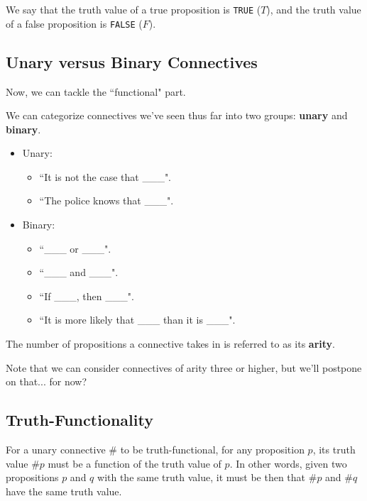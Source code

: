 \documentclass[openany]{book}
\begin{document}
We say that the truth value of a true proposition is \texttt{TRUE} ($T$), and the truth value of a false proposition is \texttt{FALSE} ($F$).

\subsection{Unary versus Binary Connectives}
Now, we can tackle the ``functional" part.

We can categorize connectives we've seen thus far into two groups: \textbf{unary} and \textbf{binary}.
\begin{itemize}
	\item Unary:
	\begin{itemize}
		\item ``It is not the case that \_\_\_".
		\item ``The police knows that \_\_\_".
	\end{itemize}
	\item Binary: 
	\begin{itemize}
		\item ``\_\_\_ or \_\_\_".
		\item ``\_\_\_ and \_\_\_".
		\item ``If \_\_\_, then \_\_\_".
		\item ``It is more likely that \_\_\_ than it is \_\_\_".
	\end{itemize}
\end{itemize}

\begin{defn}[Arity]
	The number of propositions a connective takes in is referred to as its \textbf{arity}.
\end{defn}
\begin{warn}
	Note that we can consider connectives of arity three or higher, but we'll postpone on that... for now?
\end{warn}

\subsection{Truth-Functionality}
For a unary connective $\#$ to be truth-functional, for any proposition $p$, its truth value $\#p$ must be a function of the truth value of $p$. In other words, given two propositions $p$ and $q$ with the same truth value, it must be then that $\#p$ and $\#q$ have the same truth value.
\end{document}
